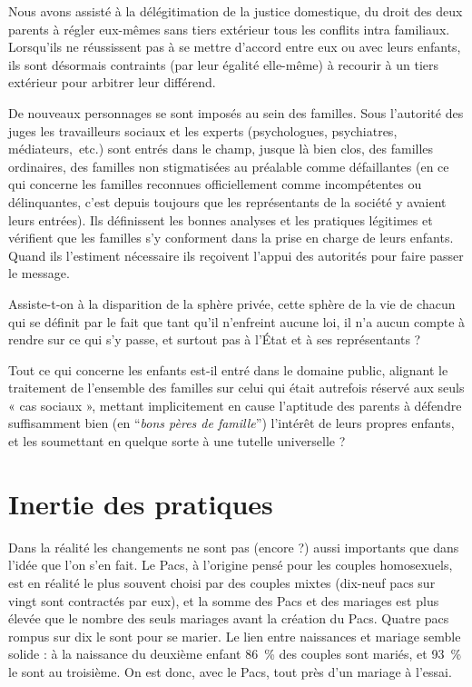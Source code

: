 Nous avons assisté à la délégitimation de la justice domestique, du droit des deux parents à régler eux-mêmes sans tiers extérieur tous les conflits intra familiaux. Lorsqu'ils ne réussissent pas à se mettre d'accord entre eux ou avec leurs enfants, ils sont désormais contraints (par leur égalité elle-même) à recourir à un tiers extérieur pour arbitrer leur différend.  

De nouveaux personnages se sont imposés au sein des familles. Sous l'autorité des juges les travailleurs sociaux et les experts (psychologues, psychiatres, médiateurs,~etc.) sont entrés dans le champ, jusque là bien clos, des familles ordinaires, des familles non stigmatisées au préalable comme défaillantes (en ce qui concerne les familles reconnues officiellement comme incompétentes ou délinquantes, c'est depuis toujours que les représentants de la société y avaient leurs entrées). Ils définissent les bonnes analyses et les pratiques légitimes et vérifient que les familles s'y conforment dans la prise en charge de leurs enfants. Quand ils l'estiment nécessaire ils reçoivent l'appui des autorités pour faire passer le message.


 

 Assiste-t-on à la disparition de la sphère privée, cette sphère de la vie de chacun qui se définit par le fait que tant qu'il n'enfreint aucune loi, il n'a aucun compte à rendre sur ce qui s'y passe, et surtout pas à l'État et à ses représentants ? 

 Tout ce qui concerne les enfants est-il entré dans le domaine public, alignant le traitement de l'ensemble des familles sur celui qui était autrefois réservé aux seuls « cas sociaux », mettant implicitement en cause l'aptitude des parents à défendre suffisamment bien (en \enquote{\emph{bons pères de famille}}) l'intérêt de leurs propres enfants, et les soumettant en quelque sorte à une tutelle universelle ?



\section{Inertie des pratiques}


Dans la réalité les changements ne sont pas (encore ?) aussi importants que dans l'idée que l'on s'en fait. 
Le Pacs, à l'origine pensé pour les couples homosexuels, est en réalité le plus souvent choisi par des couples mixtes (dix-neuf pacs sur vingt sont contractés par eux), et la somme des Pacs et des mariages est plus élevée que le nombre des seuls mariages avant la création du Pacs. Quatre pacs rompus sur dix le sont pour se marier. Le lien entre naissances et mariage semble solide : à la naissance du deuxième enfant 86~\% des couples sont mariés, et 93~\% le sont au troisième. On est donc, avec le Pacs, tout près d'un mariage à l'essai.
 
